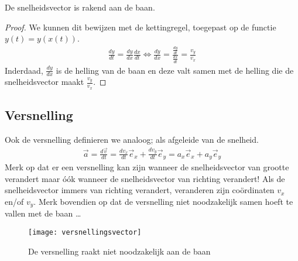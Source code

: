 \documentclass{ximera}
\begin{document}
	
	\begin{eigenschap}
	De snelheidsvector is rakend aan de baan.
	\end{eigenschap}
	\begin{proof}
	We kunnen dit bewijzen met de kettingregel, toegepast op de functie $y(t)=y(x(t))$.
	\begin{eqnarray*}
	 \frac{dy}{dt}=\frac{dy}{dx}\frac{dx}{dt}\Leftrightarrow\frac{dy}{dx}=\frac{\frac{dy}{dt}}{\frac{dx}{dt}}=\frac{v_y}{v_x}
	\end{eqnarray*}
	Inderdaad, $\frac{dy}{dx}$ is de helling van de baan en deze valt samen met de helling die de snelheidsvector maakt $\frac{v_y}{v_x}$.
	\end{proof}
	
	\subsection{Versnelling}
	
	Ook de versnelling definieren we analoog; als afgeleide van de snelheid.
	\begin{eqnarray*}
	\vec{a}=\frac{d\vec{v}}{dt}=\frac{dv_x}{dt}\vec{e}_x+\frac{dv_y}{dt}\vec{e}_y=a_x\vec{e}_x+a_y\vec{e}_y
	\end{eqnarray*}
	Merk op dat er een versnelling kan zijn wanneer de snelheidsvector van grootte verandert maar \'o\'ok wanneer de snelheidsvector van richting verandert! Als de snelheidsvector immers van richting verandert, veranderen zijn co\"ordinaten $v_x$ en/of $v_y$. Merk bovendien op dat de versnelling niet noodzakelijk samen hoeft te vallen met de baan \ldots
	\begin{figure}[h]
	\centering
	\texttt{[image: versnellingsvector]}
	\caption{De versnelling raakt niet noodzakelijk aan de baan}
	\end{figure}
	
	
	
\end{document}
